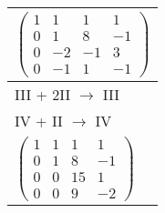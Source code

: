 \begin{longtable}{p{10cm}}
    $\displaystyle\begin{pmatrix}
                          1 & 1  & 1  & 1  \\
                          0 & 1  & 8  & -1 \\
                          0 & -2 & -1 & 3  \\
                          0 & -1 & 1  & -1
                      \end{pmatrix}$                                                         \\\hline
    III + 2II $\rightarrow$ III                                                            \\
    IV + II $\rightarrow$ IV                                                               \\\hline\pagebreak[0]

    $\displaystyle\begin{pmatrix}
                          1 & 1 & 1  & 1  \\
                          0 & 1 & 8  & -1 \\
                          0 & 0 & 15 & 1  \\
                          0 & 0 & 9  & -2
                      \end{pmatrix}$                                                          \\\hline

\end{longtable}

